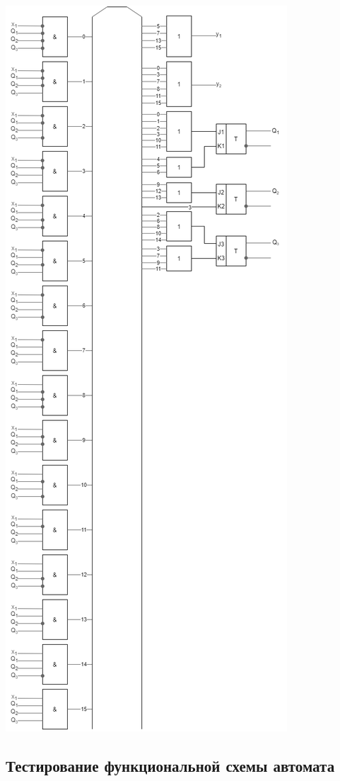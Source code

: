 \documentclass[12pt, a4paper]{article}
\begin{document}
\begin{center}
  \includegraphics[scale=0.5]{jk-trigger.png}
\end{center}

\subsection*{Тестирование функциональной схемы автомата}
\end{document}
